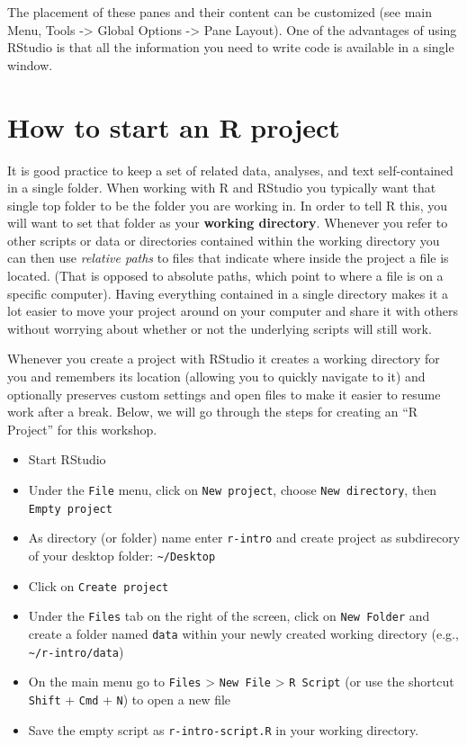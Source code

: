 \documentclass[]{book}
\providecommand{\tightlist}{%
  \setlength{\itemsep}{0pt}\setlength{\parskip}{0pt}}
\theoremstyle{definition}
\theoremstyle{definition}
\theoremstyle{definition}
\theoremstyle{remark}
\begin{document}
The placement of these panes and their content can be customized (see
main Menu, Tools -\textgreater{} Global Options -\textgreater{} Pane
Layout). One of the advantages of using RStudio is that all the
information you need to write code is available in a single window.

\section{How to start an R project}\label{how-to-start-an-r-project}

It is good practice to keep a set of related data, analyses, and text
self-contained in a single folder. When working with R and RStudio you
typically want that single top folder to be the folder you are working
in. In order to tell R this, you will want to set that folder as your
\textbf{working directory}. Whenever you refer to other scripts or data
or directories contained within the working directory you can then use
\emph{relative paths} to files that indicate where inside the project a
file is located. (That is opposed to absolute paths, which point to
where a file is on a specific computer). Having everything contained in
a single directory makes it a lot easier to move your project around on
your computer and share it with others without worrying about whether or
not the underlying scripts will still work.

Whenever you create a project with RStudio it creates a working
directory for you and remembers its location (allowing you to quickly
navigate to it) and optionally preserves custom settings and open files
to make it easier to resume work after a break. Below, we will go
through the steps for creating an ``R Project'' for this workshop.

\begin{itemize}
\tightlist
\item
  Start RStudio
\item
  Under the \texttt{File} menu, click on \texttt{New\ project}, choose
  \texttt{New\ directory}, then \texttt{Empty\ project}
\item
  As directory (or folder) name enter \texttt{r-intro} and create
  project as subdirecory of your desktop folder:
  \texttt{\textasciitilde{}/Desktop}
\item
  Click on \texttt{Create\ project}
\item
  Under the \texttt{Files} tab on the right of the screen, click on
  \texttt{New\ Folder} and create a folder named \texttt{data} within
  your newly created working directory (e.g.,
  \texttt{\textasciitilde{}/r-intro/data})
\item
  On the main menu go to \texttt{Files} \textgreater{}
  \texttt{New\ File} \textgreater{} \texttt{R\ Script} (or use the
  shortcut \texttt{Shift} + \texttt{Cmd} + \texttt{N}) to open a new
  file
\item
  Save the empty script as \texttt{r-intro-script.R} in your working
  directory.
\end{itemize}
\end{document}
